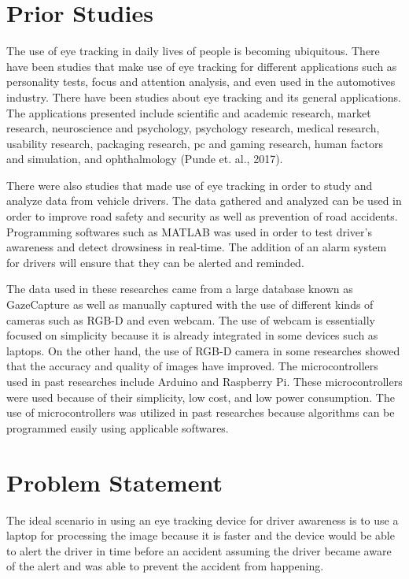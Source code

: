 \section{Prior Studies}

The use of eye tracking in daily lives of people is becoming ubiquitous. There have been studies that make use of eye tracking for different applications such as personality tests, focus and attention analysis, and even used in the automotives industry. There have been studies about eye tracking and its general applications. The applications presented include scientific and academic research, market research, neuroscience and psychology, psychology research, medical research, usability research, packaging research, pc and gaming research, human factors and simulation, and ophthalmology (Punde et. al., 2017). 

There were also studies that made use of eye tracking in order to study and analyze data from vehicle drivers. The data gathered and analyzed can be used in order to improve road safety and security as well as prevention of road accidents. Programming softwares such as MATLAB was used in order to test driver’s awareness and detect drowsiness in real-time. The addition of an alarm system for drivers will ensure that they can be alerted and reminded. 

The data used in these researches came from a large database known as GazeCapture as well as manually captured with the use of different kinds of cameras such as RGB-D and even webcam. The use of webcam is essentially focused on simplicity because it is already integrated in some devices such as laptops. On the other hand, the use of RGB-D camera in some researches showed that the accuracy and quality of images have improved. The microcontrollers used in past researches include Arduino and Raspberry Pi. These microcontrollers were used because of their simplicity, low cost, and low power consumption. The use of microcontrollers was utilized in past researches because algorithms can be programmed easily using applicable softwares.


\section{Problem Statement}

The ideal scenario in using an eye tracking device for driver awareness is to use a laptop for processing the image because it is faster and the device would be able to alert the driver in time before an accident assuming the driver became aware of the alert and was able to prevent the accident from happening.

